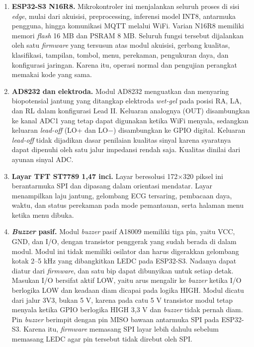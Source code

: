 \begin{enumerate}[label=\alph*.]
  \item \textbf{ESP32-S3 N16R8.} Mikrokontroler ini menjalankan seluruh proses di sisi \textit{edge}, mulai dari akuisisi, preprocessing, inferensi model INT8, antarmuka pengguna, hingga komunikasi MQTT melalui WiFi. Varian N16R8 memiliki memori \textit{flash} 16 MB dan PSRAM 8 MB. Seluruh fungsi tersebut dijalankan oleh satu \textit{firmware} yang tersusun atas modul akuisisi, gerbang kualitas, klasifikasi, tampilan, tombol, menu, perekaman, pengukuran daya, dan konfigurasi jaringan. Karena itu, operasi normal dan pengujian perangkat memakai kode yang sama.
  \item \textbf{AD8232 dan elektroda.} Modul AD8232 menguatkan dan menyaring biopotensial jantung yang ditangkap elektroda \textit{wet-gel} pada posisi RA, LA, dan RL dalam konfigurasi Lead II. Keluaran analognya (OUT) disambungkan ke kanal ADC1 yang tetap dapat digunakan ketika WiFi menyala, sedangkan keluaran \textit{lead-off} (LO+ dan LO$-$) disambungkan ke GPIO digital. Keluaran \textit{lead-off} tidak dijadikan dasar penilaian kualitas sinyal karena syaratnya dapat dipenuhi oleh satu jalur impedansi rendah saja. Kualitas dinilai dari ayunan sinyal ADC.
  \item \textbf{Layar TFT ST7789 1,47 inci.} Layar beresolusi 172$\times$320 piksel ini berantarmuka SPI dan dipasang dalam orientasi mendatar. Layar menampilkan laju jantung, gelombang ECG tersaring, pembacaan daya, waktu, dan status perekaman pada mode pemantauan, serta halaman menu ketika menu dibuka.
  \item \textbf{\textit{Buzzer} pasif.} Modul \textit{buzzer} pasif A18009 memiliki tiga pin, yaitu VCC, GND, dan I/O, dengan transistor penggerak yang sudah berada di dalam modul. Modul ini tidak memiliki osilator dan harus digerakkan gelombang kotak 2--5 kHz yang dibangkitkan LEDC pada ESP32-S3. Nadanya dapat diatur dari \textit{firmware}, dan satu bip dapat dibunyikan untuk setiap detak. Masukan I/O bersifat aktif LOW, yaitu arus mengalir ke \textit{buzzer} ketika I/O berlogika LOW dan keadaan diam dicapai pada logika HIGH. Modul dicatu dari jalur 3V3, bukan 5 V, karena pada catu 5 V transistor modul tetap menyala ketika GPIO berlogika HIGH 3,3 V dan \textit{buzzer} tidak pernah diam. Pin \textit{buzzer} berimpit dengan pin MISO bawaan antarmuka SPI pada ESP32-S3. Karena itu, \textit{firmware} memasang SPI layar lebih dahulu sebelum memasang LEDC agar pin tersebut tidak direbut oleh SPI.

\end{enumerate}
